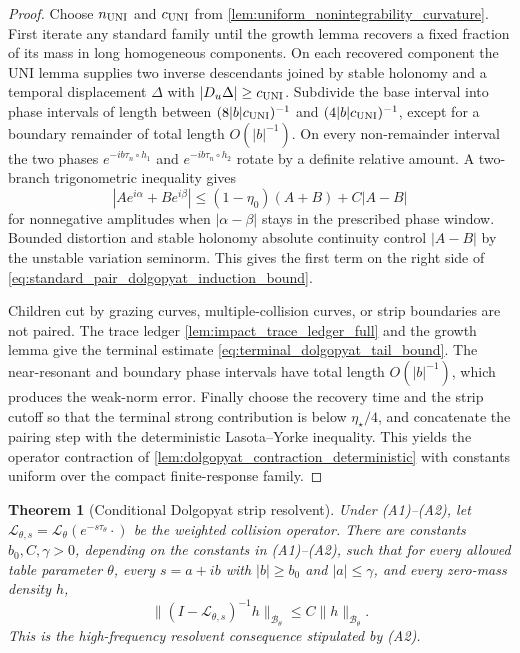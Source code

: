 \documentclass[12pt, letterpaper]{amsart}
\newcommand{\Bcal}{\mathcal{B}}
\providecommand{\Ltransfer}{\mathscr{L}}
\theoremstyle{plain}
\newtheorem{theorem}{Theorem}[section]
\theoremstyle{definition}
\theoremstyle{remark}
\begin{document}
\begin{proof}
Choose \(n_{\rm UNI}\) and \(c_{\rm UNI}\) from
\cref{lem:uniform_nonintegrability_curvature}.  First iterate any standard
family until the growth lemma recovers a fixed fraction of its mass in long
homogeneous components.  On each recovered component the UNI lemma supplies two
inverse descendants joined by stable holonomy and a temporal displacement
\(\Delta\) with \(|D_u\Delta|\ge c_{\rm UNI}\).  Subdivide the base interval into
phase intervals of length between \((8|b|c_{\rm UNI})^{-1}\) and
\((4|b|c_{\rm UNI})^{-1}\), except for a boundary remainder of total length
\(O(|b|^{-1})\).  On every non-remainder interval the two phases
\(e^{-ib\tau_n\circ h_1}\) and \(e^{-ib\tau_n\circ h_2}\) rotate by a definite
relative amount.  A two-branch trigonometric inequality gives
\begin{equation}
    |A e^{i\alpha}+B e^{i\beta}|
    \le (1-\eta_0)(A+B)+C|A-B|
\end{equation}
for nonnegative amplitudes when \(|\alpha-\beta|\) stays in the prescribed
phase window.  Bounded distortion and stable holonomy absolute continuity
control \(|A-B|\) by the unstable variation seminorm.  This gives the first
term on the right side of
\eqref{eq:standard_pair_dolgopyat_induction_bound}.

Children cut by grazing curves, multiple-collision curves, or strip boundaries
are not paired.  The trace ledger \cref{lem:impact_trace_ledger_full} and the
growth lemma give the terminal estimate
\eqref{eq:terminal_dolgopyat_tail_bound}.  The near-resonant and boundary
phase intervals have total length \(O(|b|^{-1})\), which produces the weak-norm
error.  Finally choose the recovery time and the strip cutoff so that the
terminal strong contribution is below \(\eta_\star/4\), and concatenate the
pairing step with the deterministic Lasota--Yorke inequality.  This yields the
operator contraction of \cref{lem:dolgopyat_contraction_deterministic} with
constants uniform over the compact finite-response family.
\end{proof}



\begin{theorem}[Conditional Dolgopyat strip resolvent]
\label{thm:dolgopyat_strip_resolvent_from_pairs}
Under \textup{(A1)--(A2)}, let \(\Ltransfer_{\theta,s}=\Ltransfer_\theta(e^{-s\tau_\theta}\cdot)\) be the
weighted collision operator.  There are constants \(b_0,C,\gamma>0\), depending
on the constants in \textup{(A1)--(A2)},
such that for every allowed table parameter \(\theta\), every
\(s=a+ib\) with \(|b|\ge b_0\) and \(|a|\le\gamma\), and every zero-mass density
\(h\),
\begin{equation}
\label{eq:dolgopyat_strip_resolvent_bound}
    \|(I-\Ltransfer_{\theta,s})^{-1}h\|_{\Bcal_\theta}
    \le C\|h\|_{\Bcal_\theta}.
\end{equation}
This is the high-frequency resolvent consequence stipulated by \textup{(A2)}.
\end{theorem}
\end{document}
